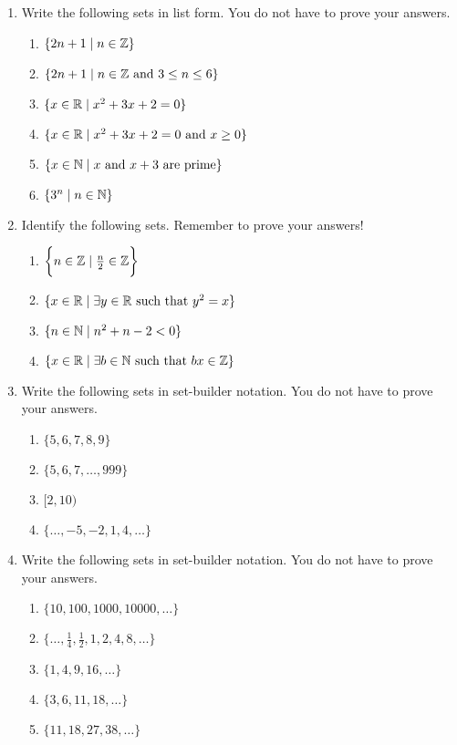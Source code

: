 \probsec{~\ref{sec:what-set}}
\begin{enumerate}
    \item Write the following sets in list form. You do not have to prove your answers.
  \begin{enumerate}
      \item $\{2n + 1 \mid n \in \mathbb{Z}\}$
      \item $\{2n + 1 \mid n \in \mathbb{Z} \text{ and } 3 \leq n \leq 6\}$
      \item $\{x \in \mathbb{R} \mid x^2 + 3x + 2 = 0\}$
      \item $\{x \in \mathbb{R} \mid x^2 + 3x + 2 = 0 \text{ and } x \geq 0\}$
      \item $\{x \in \mathbb{N} \mid x \text{ and } x+3 \text{ are prime}\}$
      \item $\{3^n \mid n \in \mathbb{N}\}$
  \end{enumerate}

    \item Identify the following sets. Remember to prove your answers!
  \begin{enumerate}
      \item $\bigg\{n \in \mathbb{Z} \mid \frac{n}{2} \in \mathbb{Z}\bigg\}$
      \item $\{x \in \mathbb{R} \mid \exists y \in \mathbb{R} \text{ such that } y^2 = x\}$
      \item $\{n \in \mathbb{N} \mid n^2 + n - 2 < 0\}$
      \item $\{x \in \mathbb{R} \mid \exists b \in \mathbb{N} \text{ such that } bx \in \mathbb{Z}\}$
  \end{enumerate}

    \item Write the following sets in set-builder notation. You do not have to prove your answers.
  \begin{enumerate}
      \item $\{5, 6, 7, 8, 9\}$
      \item $\{5, 6, 7, \dots, 999\}$
      \item $[2, 10)$
      \item $\{\dots, -5, -2, 1, 4, \dots\}$
  \end{enumerate}

    \item Write the following sets in set-builder notation. You do not have to prove your answers.
  \begin{enumerate}
      \item $\{10, 100, 1000, 10000, \dots\}$
      \item $\{\dots, \frac14, \frac12, 1, 2, 4, 8, \dots\}$
      \item $\{1, 4, 9, 16, \dots\}$
      \item $\{3, 6, 11, 18, \dots\}$
      \item $\{11, 18, 27, 38, \dots\}$
  \end{enumerate}


\end{enumerate}
